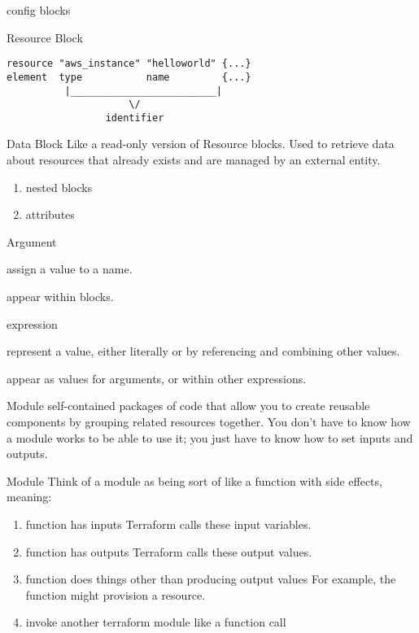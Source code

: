 \documentclass[openany, 12pt]{book}
\begin{document}
config blocks

\begin{definition}{Resource Block}{}
	\begin{verbatim}
resource "aws_instance" "helloworld" {...}
element  type           name         {...}
          |_________________________|
                     \/
                 identifier
    \end{verbatim}
\end{definition}

\begin{definition}{Data Block}{}
	Like a read-only version of Resource blocks. Used to retrieve data about
	resources that already exists and are managed by an external entity.
	\begin{enumerate}[label = {(\arabic*)}]
		\item nested blocks
		\item attributes
	\end{enumerate}
\end{definition}

\begin{definition}{Argument}{}
	\begin{alist}
		\item assign a value to a name.
		\item appear within blocks.
	\end{alist}
\end{definition}

\begin{definition}{expression}{}
	\begin{alist}
		\item represent a value, either literally or by referencing and combining other values.
		\item appear as values for arguments, or within other expressions.
	\end{alist}
\end{definition}

\begin{definition}{Module}{}
	self-contained packages of code that allow you to create reusable components
	by grouping related resources together. You don’t have to know how a module
	works to be able to use it; you just have to know how to set inputs and
	outputs.
\end{definition}

\begin{definition}{Module}{}
	Think of a module as being sort of like a function with side effects, meaning:
	\begin{enumerate}[label = {(\arabic*)}]
		\item function has inputs Terraform calls these input variables.
		\item function has outputs Terraform calls these output values.
		\item function does things other than producing output values For example, the function might provision a resource.
		\item invoke another terraform module like a function call
	\end{enumerate}
\end{definition}
\end{document}

